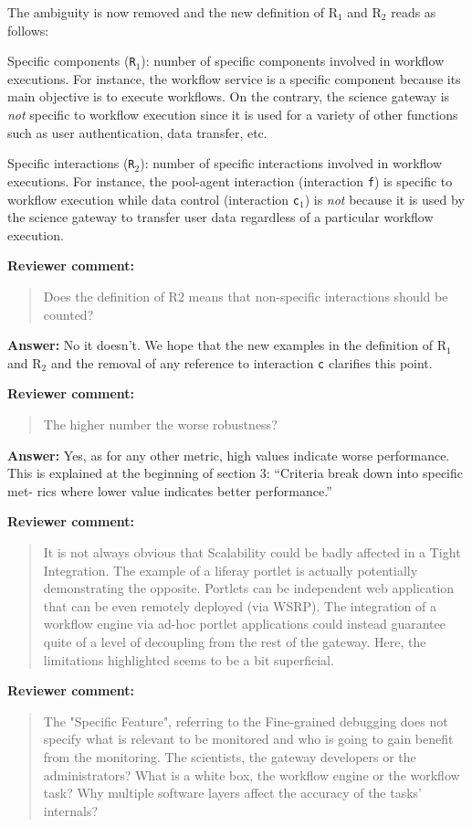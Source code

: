 \documentclass[a4]{letter}
\newenvironment{review}%
{\textbf{Reviewer comment:}\begin{quote}}%
{\end{quote}}%
\newcommand{\answer}[1]{\textbf{Answer:} #1}
\newcommand{\revised}[1]{\color{blue} #1\color{black}}
\begin{document}
\begin{letter}{}
The ambiguity is now removed and the new definition of R$_1$ and R$_2$ reads as follows:

Specific components (\texttt{R$_1$}): number of specific components involved in workflow executions. \revised{For instance, the
  workflow service is a specific component because its main objective
  is to execute workflows. On the contrary, the science gateway is
  \emph{not} specific to workflow execution since it is used for a
  variety of other functions such as user authentication, data
  transfer, etc.}

Specific interactions (\texttt{R$_2$}): number of specific
  interactions involved in workflow executions. \revised{For
    instance, the pool-agent interaction (interaction \texttt{f}) is
    specific to workflow execution while data control (interaction
    \texttt{c$_1$}) is \emph{not} because it is used by the science gateway to transfer
    user data regardless of a particular workflow execution}.

\begin{review}
Does the definition of R2 means that non-specific
  interactions should be counted?
\end{review}

\answer{No it doesn't. We hope that the new examples in the definition of
R$_1$ and R$_2$ and the removal of any reference to interaction
\texttt{c} clarifies this point.}

\begin{review}
The higher number the worse
  robustness?
\end{review}

\answer{Yes, as for any other metric, high values indicate worse
performance. This is explained at the beginning of section 3:
``Criteria break down into specific met- rics where lower value
indicates better performance.''}

\begin{review}
It is not always obvious that Scalability could be badly affected in a Tight Integration. The example of a liferay portlet is actually potentially demonstrating the opposite. Portlets can be independent web application that can be even remotely deployed (via WSRP). The integration of a workflow engine via ad-hoc portlet applications could instead guarantee quite of a level of decoupling from the rest of the gateway. Here, the limitations highlighted seems to be a bit superficial.
\end{review}

\begin{review}
The "Specific Feature", referring to the Fine-grained debugging does not specify what is relevant to be monitored and who is going to gain benefit from the monitoring. The scientists, the gateway developers or the administrators? What is a white box, the workflow engine or the workflow task? Why multiple software layers affect the accuracy of the tasks' internals?
\end{review}


\end{letter}
\end{document}
